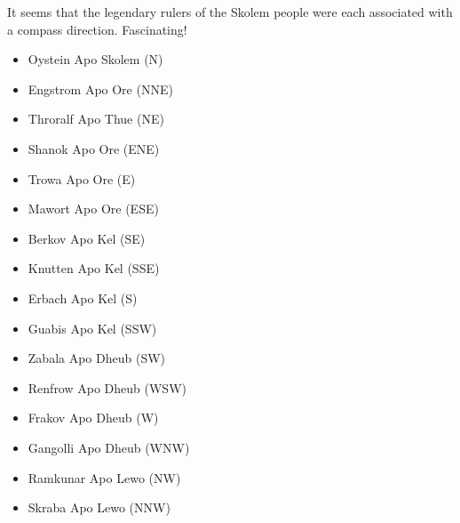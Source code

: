 {
  \LARGE
  \normalfont\wedn
It seems that the legendary rulers of the Skolem people
were each associated with a compass direction.
Fascinating!

\renewcommand{\labelitemi}{}
\begin{itemize}
\item Oystein Apo Skolem (N)
\item Engstrom Apo Ore (NNE) %
\item Throralf Apo Thue (NE)
\item Shanok Apo Ore (ENE)
\item Trowa Apo Ore (E)
\item Mawort Apo Ore (ESE) %
\item Berkov Apo Kel (SE)
\item Knutten Apo Kel (SSE)
\item Erbach Apo Kel (S)
\item Guabis Apo Kel (SSW) %
\item Zabala Apo Dheub (SW)
\item Renfrow Apo Dheub (WSW) %
\item Frakov Apo Dheub (W)
\item Gangolli Apo Dheub (WNW) %
\item Ramkunar Apo Lewo (NW)
\item Skraba Apo Lewo (NNW)
\end{itemize}
}
